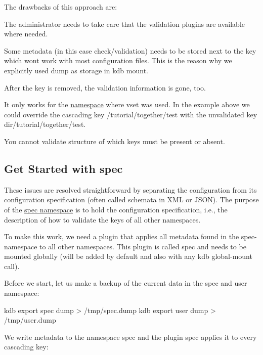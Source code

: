 The drawbacks of this approach are\+:


\begin{DoxyItemize}
\item The administrator needs to take care that the validation plugins are available where needed.
\item Some metadata (in this case {\ttfamily check/validation}) needs to be stored next to the key which won\textquotesingle{}t work with most configuration files. This is the reason why we explicitly used {\ttfamily dump} as storage in {\ttfamily kdb mount}.
\item After the key is removed, the validation information is gone, too.
\item It only works for the \hyperlink{doc_tutorials_namespaces_md}{namespace} where {\ttfamily vset} was used. In the example above we could override the cascading key {\ttfamily /tutorial/together/test} with the unvalidated key {\ttfamily dir/tutorial/together/test}.
\item You cannot validate structure of which keys must be present or absent.
\end{DoxyItemize}

\subsection*{Get Started with {\ttfamily spec}}

These issues are resolved straightforward by separating the configuration from its configuration specification (often called schemata in X\+ML or J\+S\+ON). The purpose of the \hyperlink{doc_tutorials_namespaces_md}{spec namespace} is to hold the configuration specification, i.\+e., the description of how to validate the keys of all other namespaces.

To make this work, we need a plugin that applies all metadata found in the {\ttfamily spec}-\/namespace to all other namespaces. This plugin is called {\ttfamily spec} and needs to be mounted globally (will be added by default and also with any {\ttfamily kdb global-\/mount} call).

Before we start, let us make a backup of the current data in the spec and user namespace\+:


\begin{DoxyCode}
kdb export spec dump > /tmp/spec.dump
kdb export user dump > /tmp/user.dump
\end{DoxyCode}


We write metadata to the namespace {\ttfamily spec} and the plugin {\ttfamily spec} applies it to every cascading key\+:


